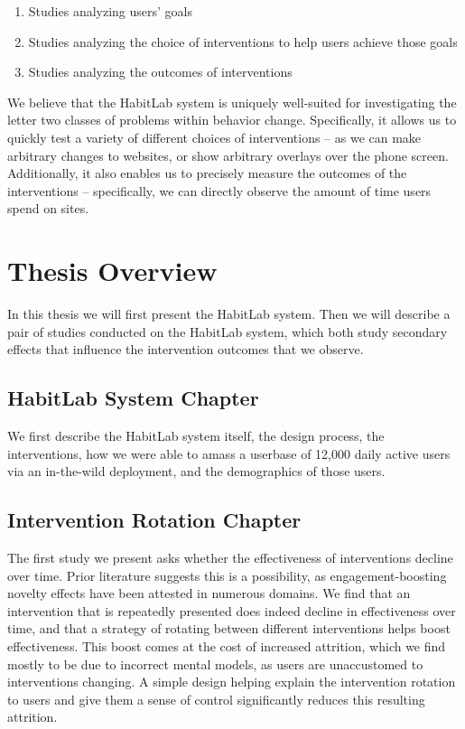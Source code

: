\begin{enumerate}
\item Studies analyzing users' goals
\item Studies analyzing the choice of interventions to help users achieve those goals
\item Studies analyzing the outcomes of interventions
\end{enumerate}

We believe that the HabitLab system is uniquely well-suited for investigating the letter two classes of problems within behavior change. Specifically, it allows us to quickly test a variety of different choices of interventions -- as we can make arbitrary changes to websites, or show arbitrary overlays over the phone screen. Additionally, it also enables us to precisely measure the outcomes of the interventions -- specifically, we can directly observe the amount of time users spend on sites.

\section{Thesis Overview}

In this thesis we will first present the HabitLab system. Then we will describe a pair of studies conducted on the HabitLab system, which both study secondary effects that influence the intervention outcomes that we observe. %

\subsection{HabitLab System Chapter}

We first describe the HabitLab system itself, the design process, the interventions, how we were able to amass a userbase of 12,000 daily active users via an in-the-wild deployment, and the demographics of those users.

\subsection{Intervention Rotation Chapter}

The first study we present asks whether the effectiveness of interventions decline over time. Prior literature suggests this is a possibility, as engagement-boosting novelty effects have been attested in numerous domains. We find that an intervention that is repeatedly presented does indeed decline in effectiveness over time, and that a strategy of rotating between different interventions helps boost effectiveness. This boost comes at the cost of increased attrition, which we find mostly to be due to incorrect mental models, as users are unaccustomed to interventions changing. A simple design helping explain the intervention rotation to users and give them a sense of control significantly reduces this resulting attrition.

